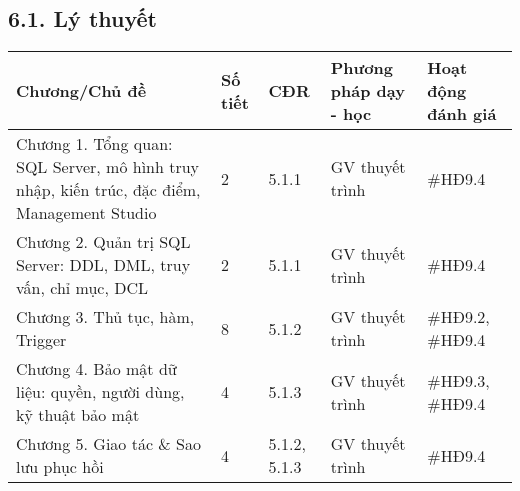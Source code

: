 \documentclass[a4paper,13pt]{article}
\begin{document}
\subsection*{6.1. Lý thuyết}
\begin{longtable}{|p{4cm}|p{2cm}|p{2cm}|p{3cm}|p{3.5cm}|}
\hline
\textbf{Chương/Chủ đề} & \textbf{Số tiết} & \textbf{CĐR} & \textbf{Phương pháp dạy - học} & \textbf{Hoạt động đánh giá} \\
\hline
Chương 1. Tổng quan: SQL Server, mô hình truy nhập, kiến trúc, đặc điểm, Management Studio & 2 & 5.1.1 & GV thuyết trình & \#HĐ9.4 \\
\hline
Chương 2. Quản trị SQL Server: DDL, DML, truy vấn, chỉ mục, DCL & 2 & 5.1.1 & GV thuyết trình & \#HĐ9.4 \\
\hline
Chương 3. Thủ tục, hàm, Trigger & 8 & 5.1.2 & GV thuyết trình & \#HĐ9.2, \#HĐ9.4 \\
\hline
Chương 4. Bảo mật dữ liệu: quyền, người dùng, kỹ thuật bảo mật & 4 & 5.1.3 & GV thuyết trình & \#HĐ9.3, \#HĐ9.4 \\
\hline
Chương 5. Giao tác \& Sao lưu phục hồi & 4 & 5.1.2, 5.1.3 & GV thuyết trình & \#HĐ9.4 \\
\hline
\end{longtable}
\end{document}
